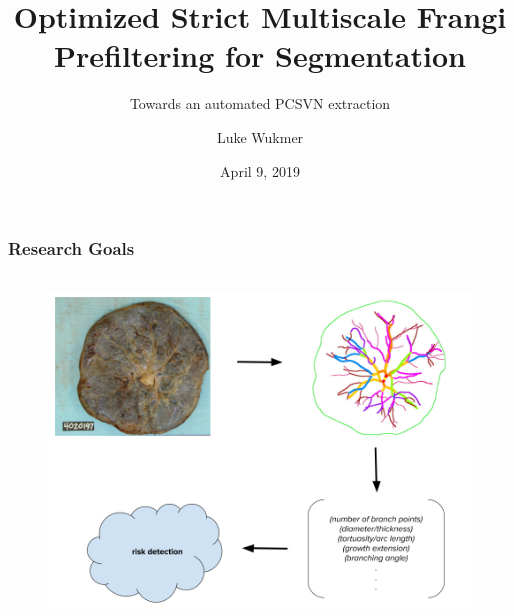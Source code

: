 \documentclass[9pt]{beamer}
\title[Thesis Defense]{Optimized Strict Multiscale Frangi Prefiltering for Segmentation}
\subtitle{Towards an automated PCSVN extraction}
\author[{Luke Wukmer}] %
{{Luke Wukmer}}%
\institute[CSULB] %
{
  Advisor: Dr. Jen-Mei Chang\\
  Department of Mathematics and Statistics\\
  California State University, Long Beach\\
  \texttt{lwukmer@gmail.com}
}
\date{April 9, 2019}
\begin{document}
\begin{frame} %
  \titlepage
\end{frame}


\begin{frame} %
	\frametitle{Research Goals}
	\begin{columns}[c]
		\begin{column}{0.5\textwidth}
			\begin{figure}
			\includegraphics[width=\textwidth]{general_research_question.png}
				

\end{figure}
\end{column}
\end{columns}
\end{frame}
\end{document}
